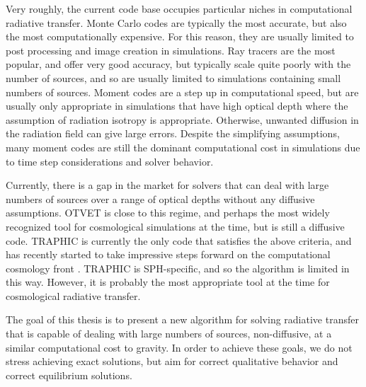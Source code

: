 Very roughly, the current code base occupies particular niches in computational radiative transfer. Monte Carlo codes are typically the most accurate, but also the most computationally expensive. For this reason, they are usually limited to post processing and image creation in simulations. Ray tracers are the most popular, and offer very good accuracy, but typically scale quite poorly with the number of sources, and so are usually limited to simulations containing small numbers of sources. Moment codes are a step up in computational speed, but are usually only appropriate in simulations that have high optical depth where the assumption of radiation isotropy is appropriate. Otherwise, unwanted diffusion in the radiation field can give large errors. Despite the simplifying assumptions, many moment codes are still the dominant computational cost in simulations due to time step considerations and solver behavior.

Currently, there is a gap in the market for solvers that can deal with large numbers of sources over a range of optical depths without any diffusive assumptions. OTVET \citep{gnedinAbel01} is close to this regime, and perhaps the most widely recognized tool for cosmological simulations at the time, but is still a diffusive code. TRAPHIC is currently the only code that satisfies the above criteria, and has recently started to take impressive steps forward on the computational cosmology front \citep{jeonEt15, jeonEt14b, jeonEt14a, rahmatiEt13b, rahmatiEt13a,jeonEt12}. TRAPHIC is SPH-specific, and so the algorithm is limited in this way. However, it is probably the most appropriate tool at the time for cosmological radiative transfer.


The goal of this thesis is to present a new algorithm for solving radiative transfer that is capable of dealing with large numbers of sources, non-diffusive, at a similar computational cost to gravity. In order to achieve these goals, we do not stress achieving exact solutions, but aim for correct qualitative behavior and correct equilibrium solutions.

%
%

